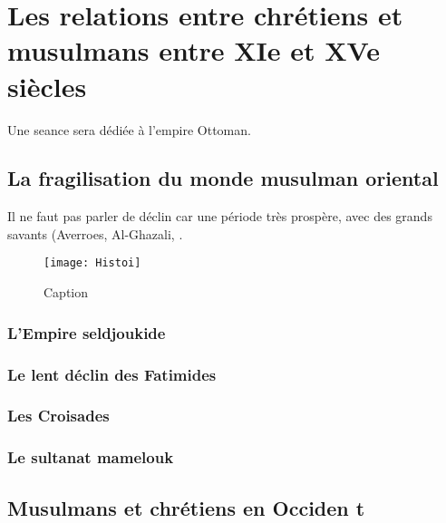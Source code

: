 \chapter{Les relations entre chrétiens et musulmans
entre XIe et XVe siècles}



Une seance sera dédiée à l'empire Ottoman.

\section{La fragilisation du monde musulman oriental}


 Il ne faut pas parler de déclin car une période très prospère, avec des grands savants (Averroes, Al-Ghazali, .

 \begin{figure}
     \centering
     \texttt{[image: Histoi]}
     \caption{Caption}
     \label{fig:my_label}
 \end{figure}


\subsection{L’Empire seldjoukide}
 
\subsection{Le lent déclin des Fatimides}
 

\subsection{Les Croisades}

\subsection{Le sultanat mamelouk}

\section{Musulmans et chrétiens en Occiden t}
